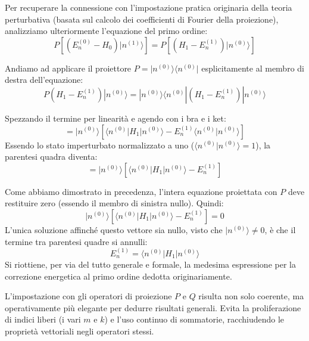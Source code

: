 Per recuperare la connessione con l'impostazione pratica originaria della teoria perturbativa (basata sul calcolo dei coefficienti di Fourier della proiezione), analizziamo ulteriormente l'equazione del primo ordine:
\begin{equation}
P \left[ \left( E_n^{(0)} - H_0 \right) |n^{(1)}\rangle \right] = P \left[ \left( H_1 - E_n^{(1)} \right) |n^{(0)}\rangle \right]
\end{equation}

Andiamo ad applicare il proiettore $P = \vert{}n^{(0)}\rangle \langle n^{(0)}\vert{}$ esplicitamente al membro di destra dell'equazione:
\begin{equation}
P \left( H_1 - E_n^{(1)} \right) |n^{(0)}\rangle = |n^{(0)}\rangle \langle n^{(0)} | \left( H_1 - E_n^{(1)} \right) |n^{(0)}\rangle
\end{equation}

Spezzando il termine per linearità e agendo con i bra e i ket:
\begin{equation}
= |n^{(0)}\rangle \left[ \langle n^{(0)} | H_1 | n^{(0)}\rangle - E_n^{(1)} \langle n^{(0)} | n^{(0)}\rangle \right]
\end{equation}
Essendo lo stato imperturbato normalizzato a uno ($\langle n^{(0)} \vert{} n^{(0)}\rangle = 1$), la parentesi quadra diventa:
\begin{equation}
= |n^{(0)}\rangle \left[ \langle n^{(0)} | H_1 | n^{(0)}\rangle - E_n^{(1)} \right]
\end{equation}

Come abbiamo dimostrato in precedenza, l'intera equazione proiettata con $P$ deve restituire zero (essendo il membro di sinistra nullo). Quindi:
\begin{equation}
|n^{(0)}\rangle \left[ \langle n^{(0)} | H_1 | n^{(0)}\rangle - E_n^{(1)} \right] = 0
\end{equation}
L'unica soluzione affinché questo vettore sia nullo, visto che $\vert{}n^{(0)}\rangle \neq 0$, è che il termine tra parentesi quadre si annulli:
\begin{equation}
E_n^{(1)} = \langle n^{(0)} | H_1 | n^{(0)}\rangle
\end{equation}
Si riottiene, per via del tutto generale e formale, la medesima espressione per la correzione energetica al primo ordine dedotta originariamente.

L'impostazione con gli operatori di proiezione $P$ e $Q$ risulta non solo coerente, ma operativamente più elegante per dedurre risultati generali. Evita la proliferazione di indici liberi (i vari $m$ e $k$) e l'uso continuo di sommatorie, racchiudendo le proprietà vettoriali negli operatori stessi.

